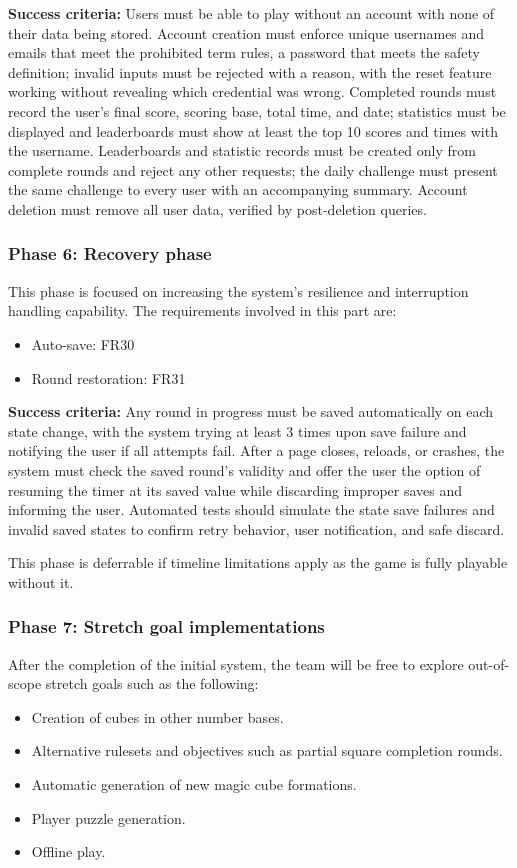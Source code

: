 \documentclass[12pt]{article}
\begin{document}
\textbf{Success criteria:} Users must be able to play without an account with none of their data being stored. Account creation must enforce unique usernames and emails that meet the prohibited term rules,
a password that meets the safety definition; invalid inputs must be rejected with a reason, with the reset feature working without revealing which credential was wrong.
Completed rounds must record the user's final score, scoring base, total time, and date; statistics must be displayed and leaderboards must show at least the top 10 scores and times with the username.
Leaderboards and statistic records must be created only from complete rounds and reject any other requests; the daily challenge must present the same challenge to every user with an accompanying summary.
Account deletion must remove all user data, verified by post-deletion queries.
 
\subsubsection{Phase 6: Recovery phase}

This phase is focused on increasing the system's resilience and interruption handling capability.
The requirements involved in this part are: 
\begin{itemize}
\item Auto-save: FR30
\item Round restoration: FR31
\end{itemize}

\textbf{Success criteria:} Any round in progress must be saved automatically on each state change, with the system trying at least 3 times upon save failure and notifying the user if all attempts fail.
After a page closes, reloads, or crashes, the system must check the saved round's validity and offer the user the option of resuming the timer at its saved value while discarding improper saves and informing the user.
Automated tests should simulate the state save failures and invalid saved states to confirm retry behavior, user notification, and safe discard.

This phase is deferrable if timeline limitations apply as the game is fully playable without it.

\subsubsection{Phase 7: Stretch goal implementations}

After the completion of the initial system, the team will be free to explore out-of-scope stretch goals such as the following:
\begin{itemize}
\item Creation of cubes in other number bases.
\item Alternative rulesets and objectives such as partial square completion rounds.
\item Automatic generation of new magic cube formations.
\item Player puzzle generation.
\item Offline play. 
\end{itemize}
\end{document}
